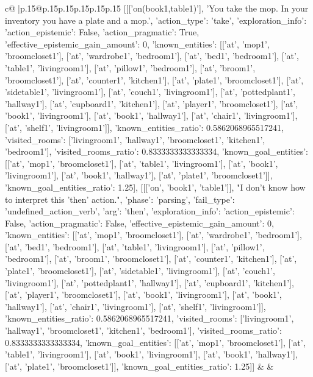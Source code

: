 \documentclass{article}
\begin{document}
{\begin{supertabular}{c@{$\;$}|p{.15\linewidth}@{}p{.15\linewidth}p{.15\linewidth}p{.15\linewidth}p{.15\linewidth}p{.15\linewidth}}
{{{	 [[['on(book1,table1)'], 'You take the mop. In your inventory you have a plate and a mop.', {'action_type': 'take', 'exploration_info': {'action_epistemic': False, 'action_pragmatic': True, 'effective_epistemic_gain_amount': 0, 'known_entities': [['at', 'mop1', 'broomcloset1'], ['at', 'wardrobe1', 'bedroom1'], ['at', 'bed1', 'bedroom1'], ['at', 'table1', 'livingroom1'], ['at', 'pillow1', 'bedroom1'], ['at', 'broom1', 'broomcloset1'], ['at', 'counter1', 'kitchen1'], ['at', 'plate1', 'broomcloset1'], ['at', 'sidetable1', 'livingroom1'], ['at', 'couch1', 'livingroom1'], ['at', 'pottedplant1', 'hallway1'], ['at', 'cupboard1', 'kitchen1'], ['at', 'player1', 'broomcloset1'], ['at', 'book1', 'livingroom1'], ['at', 'book1', 'hallway1'], ['at', 'chair1', 'livingroom1'], ['at', 'shelf1', 'livingroom1']], 'known_entities_ratio': 0.5862068965517241, 'visited_rooms': ['livingroom1', 'hallway1', 'broomcloset1', 'kitchen1', 'bedroom1'], 'visited_rooms_ratio': 0.8333333333333334, 'known_goal_entities': [['at', 'mop1', 'broomcloset1'], ['at', 'table1', 'livingroom1'], ['at', 'book1', 'livingroom1'], ['at', 'book1', 'hallway1'], ['at', 'plate1', 'broomcloset1']], 'known_goal_entities_ratio': 1.25}}], [[['on', 'book1', 'table1']], "I don't know how to interpret this 'then' action.", {'phase': 'parsing', 'fail_type': 'undefined_action_verb', 'arg': 'then', 'exploration_info': {'action_epistemic': False, 'action_pragmatic': False, 'effective_epistemic_gain_amount': 0, 'known_entities': [['at', 'mop1', 'broomcloset1'], ['at', 'wardrobe1', 'bedroom1'], ['at', 'bed1', 'bedroom1'], ['at', 'table1', 'livingroom1'], ['at', 'pillow1', 'bedroom1'], ['at', 'broom1', 'broomcloset1'], ['at', 'counter1', 'kitchen1'], ['at', 'plate1', 'broomcloset1'], ['at', 'sidetable1', 'livingroom1'], ['at', 'couch1', 'livingroom1'], ['at', 'pottedplant1', 'hallway1'], ['at', 'cupboard1', 'kitchen1'], ['at', 'player1', 'broomcloset1'], ['at', 'book1', 'livingroom1'], ['at', 'book1', 'hallway1'], ['at', 'chair1', 'livingroom1'], ['at', 'shelf1', 'livingroom1']], 'known_entities_ratio': 0.5862068965517241, 'visited_rooms': ['livingroom1', 'hallway1', 'broomcloset1', 'kitchen1', 'bedroom1'], 'visited_rooms_ratio': 0.8333333333333334, 'known_goal_entities': [['at', 'mop1', 'broomcloset1'], ['at', 'table1', 'livingroom1'], ['at', 'book1', 'livingroom1'], ['at', 'book1', 'hallway1'], ['at', 'plate1', 'broomcloset1']], 'known_goal_entities_ratio': 1.25}}]] 
	  } 
	   } 
	   } 
	 & & \\ 
 

    \theutterance {}  


\end{supertabular}}
\end{document}

